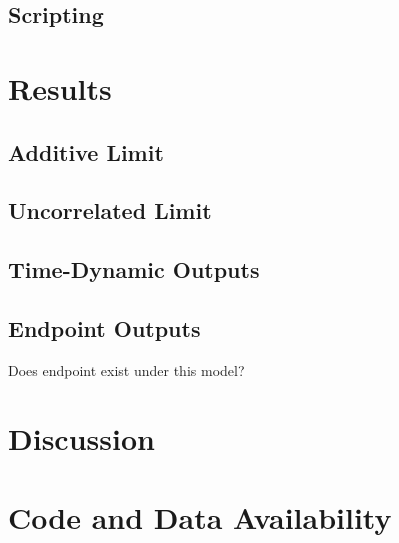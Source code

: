 \documentclass[paper=a4, fontsize=11pt,twoside]{scrartcl}       %
\begin{document}
\subsection*{Scripting}

\section*{Results}

\subsection*{Additive Limit}

\subsection*{Uncorrelated Limit}

\subsection*{Time-Dynamic Outputs}

\subsection*{Endpoint Outputs}

Does endpoint exist under this model?

\section*{Discussion}

\section*{Code and Data Availability}

\printbibliography
\end{document}
